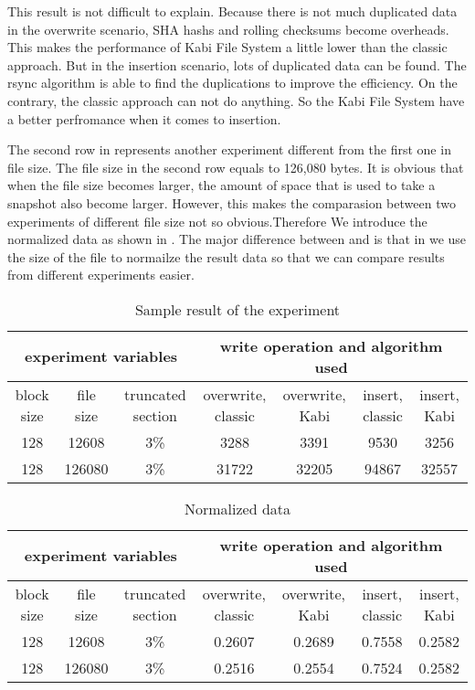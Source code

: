     This result is not difficult to explain. Because there is not much duplicated data in the overwrite scenario, SHA hashs and rolling checksums become overheads. This makes the performance of Kabi File System a little lower than the classic approach. But in the insertion scenario, lots of duplicated data can be found. The rsync algorithm is able to find the duplications to improve the efficiency. On the contrary, the classic approach can not do anything. So the Kabi File System have a better perfromance when it comes to insertion.
    
    The second row in  represents another experiment different from the first one in file size. The file size in the second row equals to 126,080 bytes. It is obvious that when the file size becomes larger, the amount of space that is used to take a snapshot also become larger. However, this makes the comparasion between two experiments of different file size not so obvious.Therefore We introduce the normalized data as shown in . The major difference between  and  is that in  we use the size of the file to normailze the result data so that we can compare results from different experiments easier.

\begin{lscape} 
\begin{table}
\caption{Sample result of the experiment}
\label{tab:sample_result}
\begin{center}
\begin{tabular}{|c|c|c|c|c|c|c|}
\hline
\multicolumn{3}{|c|}{experiment variables} & \multicolumn{4}{c|}{write operation and algorithm used} \\
\hline
block size & file size & truncated section & overwrite, classic & overwrite, Kabi & insert, classic & insert, Kabi\\
\hline
128 & 12608 & 3\% & 3288 & 3391 & 9530 & 3256 \\
\hline
128 & 126080 & 3\% & 31722 & 32205 & 94867 & 32557 \\
\hline
\end{tabular}
\end{center}
\end{table}

\begin{table}
\caption{Normalized data}
\label{tab:norm}
\begin{center}
\begin{tabular}{|c|c|c|c|c|c|c|}
\hline
\multicolumn{3}{|c|}{experiment variables} & \multicolumn{4}{c|}{write operation and algorithm used} \\
\hline
block size & file size & truncated section & overwrite, classic & overwrite, Kabi & insert, classic & insert, Kabi\\
\hline
128 & 12608 & 3\% & 0.2607 & 0.2689 & 0.7558 & 0.2582 \\
\hline
128 & 126080 & 3\% & 0.2516 & 0.2554 & 0.7524 & 0.2582 \\
\hline
\end{tabular}
\end{center}
\end{table}
\end{lscape}

